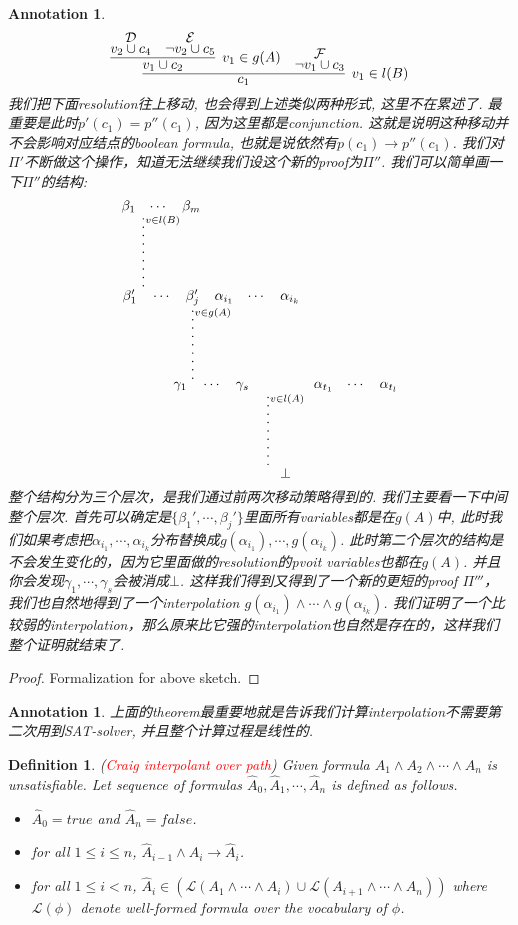 \documentclass{article}
\newtheorem{definition}[theorem]{Definition}
\newtheorem{annotation}[theorem]{Annotation}
\newcommand{\redt}[1]{\textcolor{red}{#1}}
\begin{document}
\begin{annotation}
\[
	\infer[v_1 \in l(B)]{c_1}{\infer[v_1 \in g(A)]{v_1 \cup c_2}{\deduce{v_2 \cup c_4}{\mathcal{D}} & \deduce{\neg v_2 \cup c_5}{\mathcal{E}}} & \deduce{\neg v_1 \cup c_3}{\mathcal{F}}}
\]
我们把下面resolution往上移动, 也会得到上述类似两种形式, 这里不在累述了. 最重要是此时$p'(c_1) = p''(c_1)$, 因为这里都是conjunction. 这就是说明这种移动并不会影响对应结点的boolean formula, 也就是说依然有$p(c_1)\to p''(c_1)$. 我们对$\varPi'$不断做这个操作，知道无法继续我们设这个新的proof为$\varPi''$. 我们可以简单画一下$\varPi''$的结构:
\[
	\deduce[\lvdots^{v \in l(A)}]{\bot}{\deduce[\lvdots^{v \in g(A)}]{\gamma_1 \quad \cdots \quad \gamma_s}{\deduce[\lvdots^{v \in l(B)}]{\beta_1' \quad \cdots \quad \beta_j'}{\beta_1 & \cdots & \beta_m} & \alpha_{i_1} & \cdots & \alpha_{i_k}} & \alpha_{t_1} & \cdots & \alpha_{t_l}}
\]
整个结构分为三个层次，是我们通过前两次移动策略得到的. 我们主要看一下中间整个层次. 首先可以确定是$\{\beta_1',\cdots, \beta_j'\}$里面所有variables都是在$g(A)$中, 此时我们如果考虑把$\alpha_{i_1}, \cdots , \alpha_{i_k}$分布替换成$g(\alpha_{i_1}), \cdots,  g(\alpha_{i_k})$. 此时第二个层次的结构是不会发生变化的，因为它里面做的resolution的pvoit variables也都在$g(A)$. 并且你会发现${\gamma_1, \cdots, \gamma_s}$会被消成$\bot$. 这样我们得到又得到了一个新的更短的proof $\varPi'''$，我们也自然地得到了一个interpolation $g(\alpha_{i_1}) \wedge \cdots \wedge g(\alpha_{i_k})$. 我们证明了一个比较弱的interpolation，那么原来比它强的interpolation也自然是存在的，这样我们整个证明就结束了.
\end{annotation}

\begin{proof}
\rm Formalization for above sketch.
\end{proof}

\begin{annotation}
\rm 上面的theorem最重要地就是告诉我们计算interpolation不需要第二次用到SAT-solver, 并且整个计算过程是线性的. 
\end{annotation}

\begin{definition}
\rm (\redt{Craig interpolant over path}) Given formula $A_1 \wedge A_2 \wedge \cdots \wedge A_n$ is unsatisfiable. Let sequence of formulas $\hat{A}_0, \hat{A}_1, \cdots, \hat{A}_n$ is defined as follows.
\begin{itemize}
	\item $\hat{A}_0 = true$ and $\hat{A}_n = false$. 
	\item for all $1 \leq i \leq n$, $\hat{A}_{i-1} \wedge A_i \to \hat{A}_{i}$.
	\item for all $1 \leq i < n$, $\hat{A}_i \in (\mathcal{L}(A_1 \wedge \cdots \wedge A_i) \cup \mathcal{L}(A_{i+1} \wedge \cdots \wedge A_n))$ where $\mathcal{L}(\phi)$ denote well-formed formula over the vocabulary of $\phi$.
\end{itemize}
\end{definition}
\end{document}
